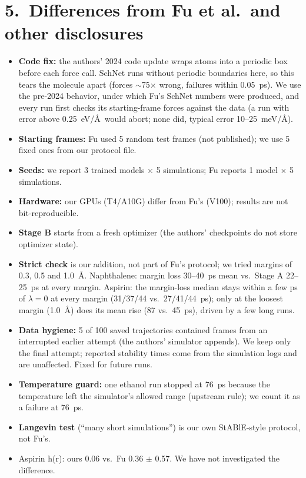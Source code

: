 \documentclass[10pt]{article}
\begin{document}
\section*{5.\ Differences from Fu et al.\ and other disclosures}
\begin{itemize}
  \item \textbf{Code fix:} the authors' 2024 code update wraps atoms into a periodic box before each force call.
        SchNet runs without periodic boundaries here, so this tears the molecule apart (forces $\sim$75$\times$
        wrong, failures within 0.05~ps). We use the pre-2024 behavior, under which Fu's SchNet numbers were
        produced, and every run first checks its starting-frame forces against the data (a run with error above
        0.25~eV/\AA\ would abort; none did, typical error 10--25~meV/\AA).
  \item \textbf{Starting frames:} Fu used 5 random test frames (not published); we use 5 fixed ones from our protocol file.
  \item \textbf{Seeds:} we report 3 trained models $\times$ 5 simulations; Fu reports 1 model $\times$ 5 simulations.
  \item \textbf{Hardware:} our GPUs (T4/A10G) differ from Fu's (V100); results are not bit-reproducible.
  \item \textbf{Stage B} starts from a fresh optimizer (the authors' checkpoints do not store optimizer state).
  \item \textbf{Strict check} is our addition, not part of Fu's protocol; we tried margins of 0.3, 0.5 and 1.0~\AA.
        Naphthalene: margin loss 30--40~ps mean vs.\ Stage A 22--25~ps at every margin. Aspirin: the margin-loss median
        stays within a few ps of $\lambda{=}0$ at every margin (31/37/44 vs.\ 27/41/44~ps); only at the loosest
        margin (1.0~\AA) does its mean rise (87 vs.\ 45~ps), driven by a few long runs.
  \item \textbf{Data hygiene:} 5 of 100 saved trajectories contained frames from an interrupted earlier attempt
        (the authors' simulator appends). We keep only the final attempt; reported stability times come from the
        simulation logs and are unaffected. Fixed for future runs.
  \item \textbf{Temperature guard:} one ethanol run stopped at 76~ps because the temperature left the simulator's
        allowed range (upstream rule); we count it as a failure at 76~ps.
  \item \textbf{Langevin test} (``many short simulations'') is our own StABlE-style protocol, not Fu's.
  \item Aspirin h(r): ours 0.06 vs.\ Fu 0.36 $\pm$ 0.57. We have not investigated the difference.
\end{itemize}
\end{document}
